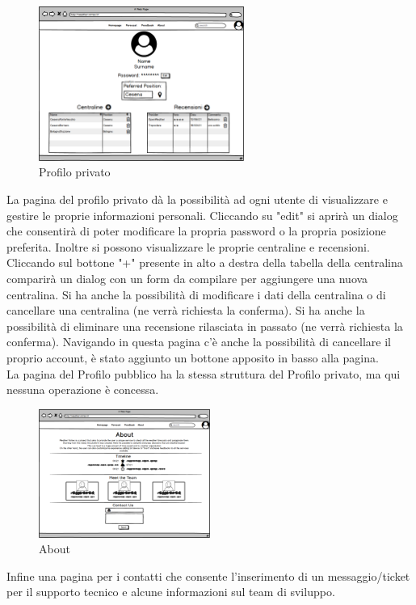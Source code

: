 \begin{figure}[H]
    \caption{Profilo privato}
    \label{fig:Home}
    \centering
    \includegraphics[width=0.6\textwidth]{MockUps/Private Profile.png}
\end{figure}
La pagina del profilo privato dà la possibilità ad ogni utente di visualizzare e gestire le proprie informazioni personali. Cliccando su "edit" si aprirà un dialog che consentirà di poter modificare la propria password o la propria posizione preferita.
Inoltre si possono visualizzare le proprie centraline e recensioni.
Cliccando sul bottone "+" presente in alto a destra della tabella della centralina comparirà un dialog con un form da compilare per aggiungere una nuova centralina.  
Si ha anche la possibilità di modificare i dati della centralina o di cancellare una centralina (ne verrà richiesta la conferma). 
Si ha anche la possibilità di eliminare una recensione rilasciata in passato (ne verrà richiesta la conferma).
Navigando in questa pagina c'è anche la possibilità di cancellare il proprio account, è stato aggiunto un bottone apposito in basso alla pagina.\\

La pagina del Profilo pubblico ha la stessa struttura del Profilo privato, ma qui nessuna operazione è concessa. 

\begin{figure}[H]
    \caption{About}
    \label{fig:Home}
    \centering
    \includegraphics[width=0.5\textwidth]{MockUps/about.png}
\end{figure}
Infine una pagina per i contatti che consente l'inserimento di un messaggio/ticket
per il supporto tecnico e alcune informazioni sul team di sviluppo.
